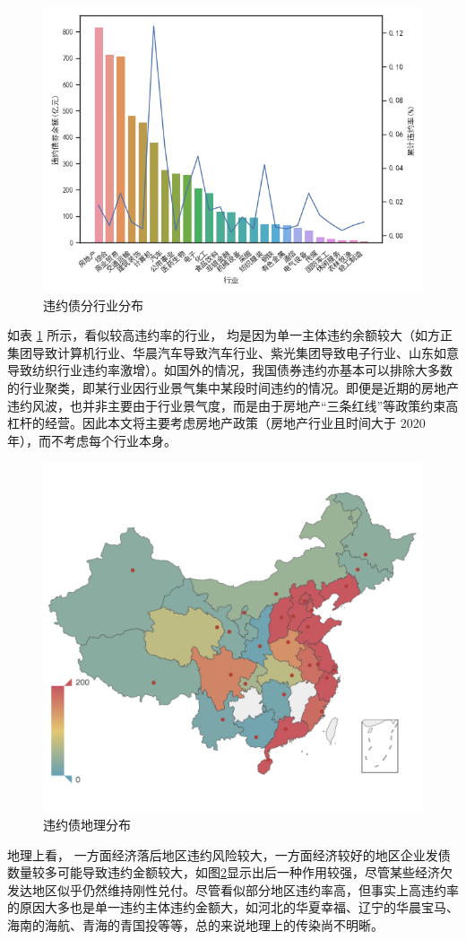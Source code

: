 \begin{figure}[h]
	\centering
	\includegraphics[width=.9\linewidth]{./data/industry.png}
	\caption{\label{fig:industry}违约债分行业分布}
\end{figure}

如表 \ref{fig:industry} 所示，看似较高违约率的行业，
均是因为单一主体违约余额较大（如方正集团导致计算机行业、华晨汽车导致汽车行业、紫光集团导致电子行业、山东如意导致纺织行业违约率激增）。如国外的情况\cite{azizpour2018exploring}，我国债券违约亦基本可以排除大多数的行业聚类，即某行业因行业景气集中某段时间违约的情况。即便是近期的房地产违约风波，也并非主要由于行业景气度，而是由于房地产“三条红线”等政策约束高杠杆的经营。因此本文将主要考虑房地产政策（房地产行业且时间大于 2020 年），而不考虑每个行业本身。

\begin{figure}[h]
	\centering
	\includegraphics[width=.9\linewidth]{./data/default_by_geo.png}
	\caption{\label{fig:geo}违约债地理分布}
\end{figure}
地理上看，
一方面经济落后地区违约风险较大，一方面经济较好的地区企业发债数量较多可能导致违约金额较大，如图\ref{fig:geo}显示出后一种作用较强，尽管某些经济欠发达地区似乎仍然维持刚性兑付。尽管看似部分地区违约率高，但事实上高违约率的原因大多也是单一违约主体违约金额大，如河北的华夏幸福、辽宁的华晨宝马、海南的海航、青海的青国投等等，总的来说地理上的传染尚不明晰。

